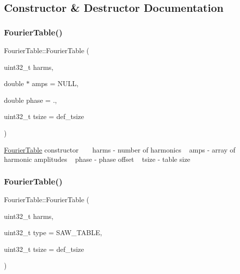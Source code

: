 \subsection{Constructor \& Destructor Documentation}
\mbox{\label{class_fourier_table_ae208f9476736fdc0fe915773374d6e5b}} 
\subsubsection{\texorpdfstring{Fourier\+Table()}{FourierTable()}\hspace{0.1cm}{\footnotesize\ttfamily [1/2]}}
{\footnotesize\ttfamily Fourier\+Table\+::\+Fourier\+Table (\begin{DoxyParamCaption}\item[{uint32\+\_\+t}]{harms,  }\item[{double $\ast$}]{amps = {\ttfamily NULL},  }\item[{double}]{phase = {.},  }\item[{uint32\+\_\+t}]{tsize = {\ttfamily def\+\_\+tsize} }\end{DoxyParamCaption})}

\hyperlink{class_fourier_table}{Fourier\+Table} constructor ~\newline
~\newline
harms -\/ number of harmonics ~\newline
amps -\/ array of harmonic amplitudes ~\newline
phase -\/ phase offset ~\newline
tsize -\/ table size ~\newline
\mbox{\label{class_fourier_table_ac45625fd3a53952e75131fb8ea029432}} 
\subsubsection{\texorpdfstring{Fourier\+Table()}{FourierTable()}\hspace{0.1cm}{\footnotesize\ttfamily [2/2]}}
{\footnotesize\ttfamily Fourier\+Table\+::\+Fourier\+Table (\begin{DoxyParamCaption}\item[{uint32\+\_\+t}]{harms,  }\item[{uint32\+\_\+t}]{type = {\ttfamily SAW\+\_\+TABLE},  }\item[{uint32\+\_\+t}]{tsize = {\ttfamily def\+\_\+tsize} }\end{DoxyParamCaption})}

